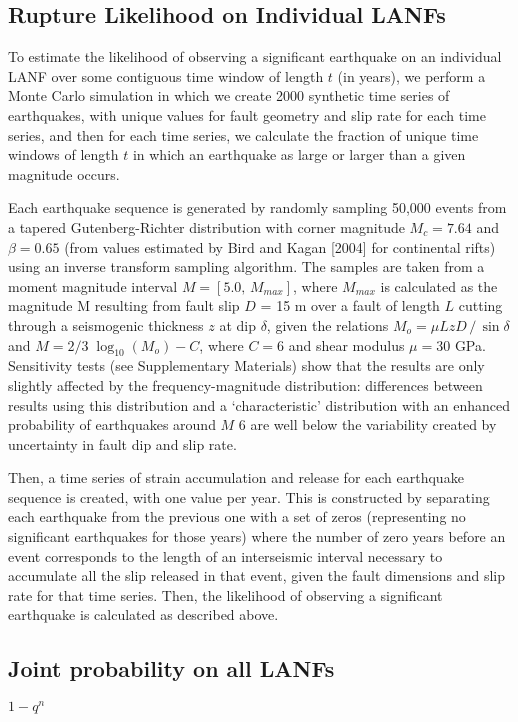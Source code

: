 \documentclass[twocolumn,grl]{AGUTeX}
\begin{document}
\begin{article}
\subsection{Rupture Likelihood on Individual LANFs}
To estimate the likelihood of observing a significant earthquake on an individual LANF over some contiguous time window of length $t$ (in years), we perform a Monte Carlo simulation in which we create 2000 synthetic time series of earthquakes, with unique values for fault geometry and slip rate for each time series, and then for each time series, we calculate the fraction of unique time windows of length $t$ in which an earthquake as large or larger than a given magnitude occurs.

Each earthquake sequence is generated by randomly sampling 50,000 events from a tapered Gutenberg-Richter distribution with corner magnitude $M_c = 7.64$ and $\beta = 0.65$ (from values estimated by Bird and Kagan [2004] for continental rifts) using an inverse transform sampling algorithm.  The samples are taken from a moment magnitude interval $M = [5.0, \, M_{max}]$, where $M_{max}$ is calculated as the magnitude M resulting from fault slip $D$ = 15 m over a fault of length $L$ cutting through a seismogenic thickness $z$ at dip $\delta$, given the relations $ M_o = \mu L z D \,/ \, \sin \delta $ and $ M = 2/3 \; \log_{10} (M_o) - C $, where $C = 6 $ and shear modulus $\mu = 30$ GPa.  Sensitivity tests (see Supplementary Materials) show that the results are only slightly affected by the frequency-magnitude distribution: differences between results using this distribution and a `characteristic' distribution with an enhanced probability of earthquakes around $M$ 6 are well below the variability created by uncertainty in fault dip and slip rate.

Then, a time series of strain accumulation and release for each earthquake sequence is created, with one value per year.  This is constructed by separating each earthquake from the previous one with a set of zeros (representing no significant earthquakes for those years) where the number of zero years before an event corresponds to the length of an interseismic interval necessary to accumulate all the slip released in that event, given the fault dimensions and slip rate for that time series. Then, the likelihood of observing a significant earthquake is calculated as described above.

\subsection{Joint probability on all LANFs}
$1-q^n$


\end{article}
\end{document}
